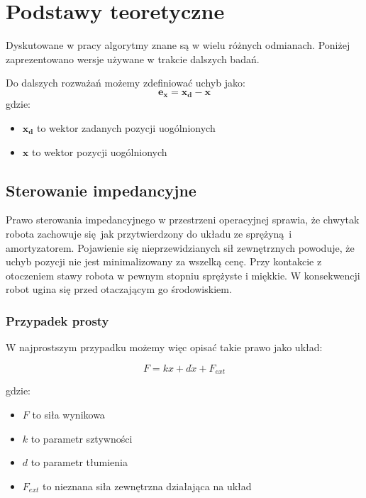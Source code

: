 
\chapter{Podstawy teoretyczne\label{chap:przeglad_literatury}}
Dyskutowane w pracy algorytmy znane są w wielu różnych odmianach. Poniżej zaprezentowano wersje używane w trakcie dalszych badań. 

Do dalszych rozważań możemy zdefiniować uchyb jako:
\begin{equation}
	\boldsymbol{e_x} = \boldsymbol{x_d} - \boldsymbol{x}
\end{equation}
gdzie:
\begin{itemize}
\item $\boldsymbol{x_d}$ to wektor zadanych pozycji uogólnionych
\item $\boldsymbol{x}$ to wektor pozycji uogólnionych
\end{itemize}

\section{Sterowanie impedancyjne}
Prawo sterowania impedancyjnego w przestrzeni operacyjnej sprawia, że chwytak robota zachowuje się jak przytwierdzony do układu ze sprężyną i amortyzatorem. Pojawienie się nieprzewidzianych sił zewnętrznych powoduje, że uchyb pozycji nie jest minimalizowany za wszelką cenę. Przy kontakcie z otoczeniem stawy robota w pewnym stopniu sprężyste i miękkie. W konsekwencji robot ugina się przed otaczającym go środowiskiem. 

\subsection{Przypadek prosty}
W najprostszym przypadku możemy więc opisać takie prawo jako układ: 

	\begin{equation}
	F = kx + d\dot{x} + F_{ext}
	\end{equation}

gdzie:
\begin{itemize}
\item $F$ to siła wynikowa
\item $k$ to parametr sztywności
\item $d$ to parametr tłumienia
\item $F_{ext}$ to nieznana siła zewnętrzna działająca na układ
\end{itemize} 

